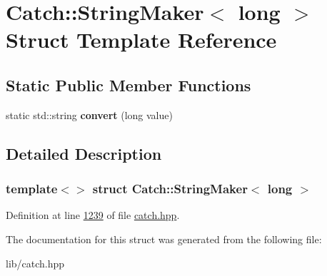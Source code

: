 \hypertarget{structCatch_1_1StringMaker_3_01long_01_4}{}\section{Catch\+::String\+Maker$<$ long $>$ Struct Template Reference}
\label{structCatch_1_1StringMaker_3_01long_01_4}
\subsection*{Static Public Member Functions}
\begin{DoxyCompactItemize}
\item 
\mbox{\label{structCatch_1_1StringMaker_3_01long_01_4_a1c0c56497813e7a6425c5411d5e66447}} 
static std\+::string {\bfseries convert} (long value)
\end{DoxyCompactItemize}


\subsection{Detailed Description}
\subsubsection*{template$<$$>$\newline
struct Catch\+::\+String\+Maker$<$ long $>$}



Definition at line \mbox{\hyperlink{catch_8hpp_source_l01239}{1239}} of file \mbox{\hyperlink{catch_8hpp_source}{catch.\+hpp}}.



The documentation for this struct was generated from the following file\+:\begin{DoxyCompactItemize}
\item 
lib/catch.\+hpp\end{DoxyCompactItemize}
